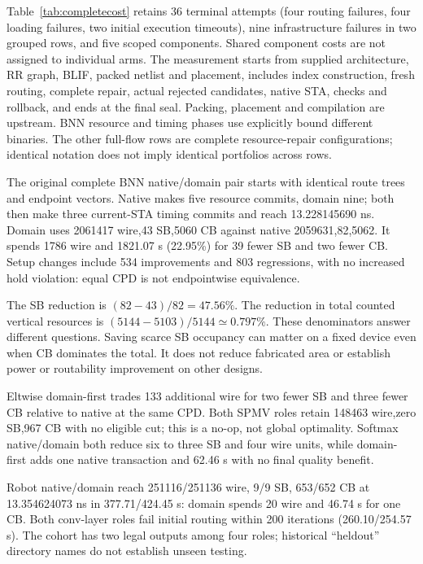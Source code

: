 \documentclass[conference,10pt]{IEEEtran}
\begin{document}
Table~\ref{tab:completecost} retains 36 terminal attempts (four routing failures, four loading failures, two initial execution timeouts), nine infrastructure failures in two grouped rows, and five scoped components. Shared component costs are not assigned to individual arms. The measurement starts from supplied architecture, RR graph, BLIF, packed netlist and placement, includes index construction, fresh routing, complete repair, actual rejected candidates, native STA, checks and rollback, and ends at the final seal. Packing, placement and compilation are upstream. BNN resource and timing phases use explicitly bound different binaries. The other full-flow rows are complete resource-repair configurations; identical notation does not imply identical portfolios across rows.

The original complete BNN native/domain pair starts with identical route trees and endpoint vectors. Native makes five resource commits, domain nine; both then make three current-STA timing commits and reach 13.228145690 ns. Domain uses 2061417 wire,43 SB,5060 CB against native 2059631,82,5062. It spends 1786 wire and 1821.07 s (22.95\%) for 39 fewer SB and two fewer CB. Setup changes include 534 improvements and 803 regressions, with no increased hold violation: equal CPD is not endpointwise equivalence.

The SB reduction is $(82-43)/82=47.56\%$. The reduction in total counted vertical resources is $(5144-5103)/5144\simeq 0.797\%$. These denominators answer different questions. Saving scarce SB occupancy can matter on a fixed device even when CB dominates the total. It does not reduce fabricated area or establish power or routability improvement on other designs.

Eltwise domain-first trades 133 additional wire for two fewer SB and three fewer CB relative to native at the same CPD. Both SPMV roles retain 148463 wire,zero SB,967 CB with no eligible cut; this is a no-op, not global optimality. Softmax native/domain both reduce six to three SB and four wire units, while domain-first adds one native transaction and 62.46 s with no final quality benefit.

Robot native/domain reach 251116/251136 wire, 9/9 SB, 653/652 CB at 13.354624073 ns in 377.71/424.45 s: domain spends 20 wire and 46.74 s for one CB. Both conv-layer roles fail initial routing within 200 iterations (260.10/254.57 s). The cohort has two legal outputs among four roles; historical ``heldout'' directory names do not establish unseen testing.
\end{document}
